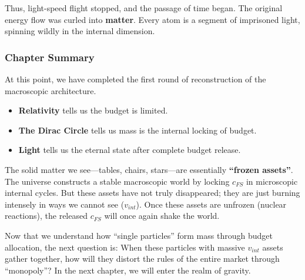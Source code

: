 Thus, light-speed flight stopped, and the passage of time began. The original energy flow was curled into \textbf{matter}. Every atom is a segment of imprisoned light, spinning wildly in the internal dimension.

\subsubsection{Chapter Summary}

At this point, we have completed the first round of reconstruction of the macroscopic architecture.

\begin{itemize}
\item \textbf{Relativity} tells us the budget is limited.

\item \textbf{The Dirac Circle} tells us mass is the internal locking of budget.

\item \textbf{Light} tells us the eternal state after complete budget release.
\end{itemize}

The solid matter we see---tables, chairs, stars---are essentially \textbf{``frozen assets''}. The universe constructs a stable macroscopic world by locking $c_{FS}$ in microscopic internal cycles. But these assets have not truly disappeared; they are just burning intensely in ways we cannot see ($v_{int}$). Once these assets are unfrozen (nuclear reactions), the released $c_{FS}$ will once again shake the world.

Now that we understand how ``single particles'' form mass through budget allocation, the next question is: When these particles with massive $v_{int}$ assets gather together, how will they distort the rules of the entire market through ``monopoly''? In the next chapter, we will enter the realm of gravity.

